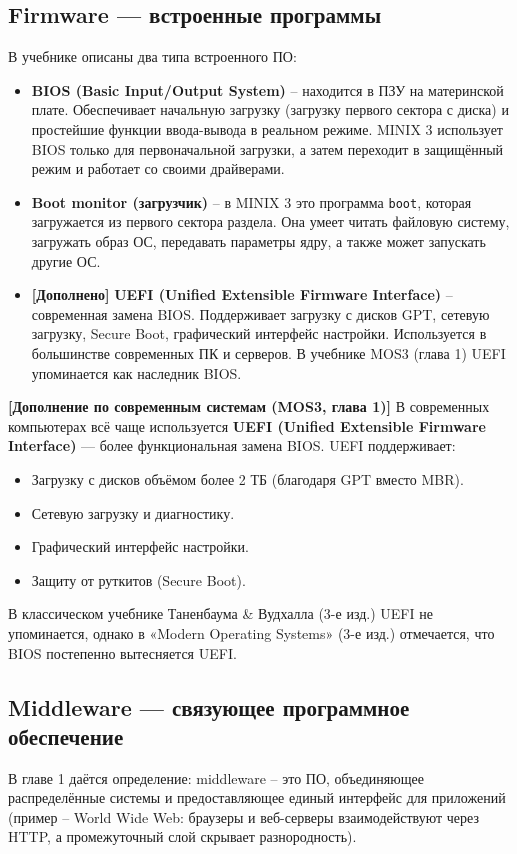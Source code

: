 \documentclass[a4paper,12pt]{article}
\begin{document}
\subsection{Firmware — встроенные программы}
В учебнике описаны два типа встроенного ПО:
\begin{itemize}
    \item \textbf{BIOS (Basic Input/Output System)} – находится в ПЗУ на материнской плате. Обеспечивает начальную загрузку (загрузку первого сектора с диска) и простейшие функции ввода-вывода в реальном режиме. MINIX 3 использует BIOS только для первоначальной загрузки, а затем переходит в защищённый режим и работает со своими драйверами.
    \item \textbf{Boot monitor (загрузчик)} – в MINIX 3 это программа \texttt{boot}, которая загружается из первого сектора раздела. Она умеет читать файловую систему, загружать образ ОС, передавать параметры ядру, а также может запускать другие ОС.
    \item \textbf{[Дополнено]} \textbf{UEFI (Unified Extensible Firmware Interface)} – современная замена BIOS. Поддерживает загрузку с дисков GPT, сетевую загрузку, Secure Boot, графический интерфейс настройки. Используется в большинстве современных ПК и серверов. В учебнике MOS3 (глава 1) UEFI упоминается как наследник BIOS.
\end{itemize}

\textbf{[Дополнение по современным системам (MOS3, глава 1)]}
В современных компьютерах всё чаще используется \textbf{UEFI (Unified Extensible Firmware Interface)} — более функциональная замена BIOS. UEFI поддерживает:
\begin{itemize}
    \item Загрузку с дисков объёмом более 2 ТБ (благодаря GPT вместо MBR).
    \item Сетевую загрузку и диагностику.
    \item Графический интерфейс настройки.
    \item Защиту от руткитов (Secure Boot).
\end{itemize}
В классическом учебнике Таненбаума \& Вудхалла (3-е изд.) UEFI не упоминается, однако в «Modern Operating Systems» (3-е изд.) отмечается, что BIOS постепенно вытесняется UEFI.

\subsection{Middleware — связующее программное обеспечение}
В главе 1 даётся определение: middleware – это ПО, объединяющее распределённые системы и предоставляющее единый интерфейс для приложений (пример – World Wide Web: браузеры и веб-серверы взаимодействуют через HTTP, а промежуточный слой скрывает разнородность).
\end{document}
